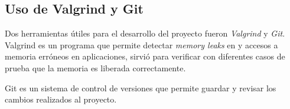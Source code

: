 \documentclass[a4paper,12pt]{article}
\begin{document}
\subsection{Uso de Valgrind y Git}
Dos herramientas útiles para el desarrollo del proyecto fueron \emph{Valgrind} y \emph{Git}. Valgrind es un programa
que permite detectar \emph{memory leaks} en y accesos a memoria erróneos en aplicaciones, sirvió para verificar
con diferentes casos de prueba que la memoria es liberada correctamente.

Git es un sistema de control de versiones que permite guardar y revisar los cambios realizados al proyecto.


\end{document}
